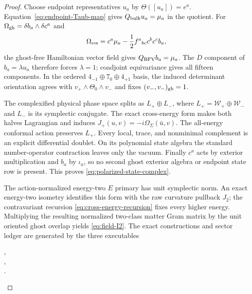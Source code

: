 \documentclass[11pt]{article}
\theoremstyle{definition}
\theoremstyle{remark}
\newcommand{\W}{\mathcal W}
\begin{document}
\begin{proof}
Choose endpoint representatives $u_a$ by
$\Theta([u_a])=e^a$.  Equation~\eqref{eq:endpoint-Taub-map} gives
$Q_{\rm bulk}u_a=\mu_a$ in the quotient.  For
$\Omega_{\rm gh}=\delta b_a\wedge\delta c^a$ and
\begin{equation}\label{eq:residual-BFV-charge}
 \Omega_{\rm res}=c^a\mu_a-\frac12f^a{}_{bc}c^bc^cb_a,
\end{equation}
the ghost-free Hamiltonian vector field gives $Q_{\rm BFV}b_a=\mu_a$.
The $D$ component of $b_a=\lambda u_a$ therefore forces $\lambda=1$;
coadjoint equivariance gives all fifteen components.  In the ordered
$4_{-1}\oplus7_0\oplus4_{+1}$ basis, the induced determinant orientation
agrees with $v_+\wedge\Theta_0\wedge v_-$ and fixes
$(v_-,v_-)_{\rm gh}=1$.

The complexified physical phase space splits as
$L_+\oplus L_-$, where $L_+=\W_+\oplus\W_-$ and $L_-$ is its symplectic
conjugate.  The exact cross-energy form makes both halves Lagrangian and
induces $J_+(u,v)=-i\Omega_\Sigma(\bar u,v)$.  The all-energy conformal
action preserves $L_+$.  Every local, trace, and nonminimal complement is an
explicit differential doublet.  On its polynomial state algebra the standard
number-operator contraction leaves only the vacuum.  Finally $c^a$ acts by
exterior multiplication and $b_a$ by $\iota_a$, so no second ghost exterior
algebra or endpoint state row is present.  This proves
\eqref{eq:polarized-state-complex}.

The action-normalized energy-two $E$ primary has unit symplectic norm.  An
exact energy-two isometry identifies this form with the raw curvature
pullback $J_2$; the contravariant recursion
\eqref{eq:cross-energy-recursion} fixes every higher energy.  Multiplying the
resulting normalized two-class matter Gram matrix by the unit oriented ghost
overlap yields \eqref{eq:field-I2}.  The exact constructions and sector
ledger are generated by the three executables
\begin{center}\small
{},\\
,\\
.
\end{center}
\end{proof}
\end{document}
